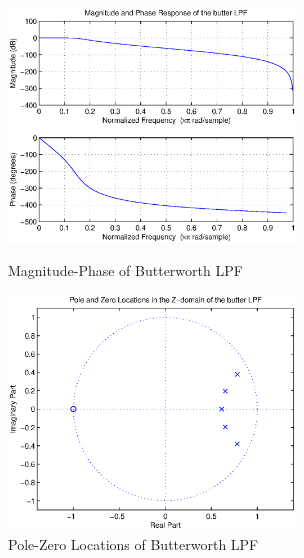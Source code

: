 \documentclass{article}
\begin{document}
\begin{figure}[htb]
\begin{minipage}[b]{0.5\linewidth}
\centering
\includegraphics[width=3in]{project6_01.eps}
\caption{Magnitude-Phase of  Butterworth LPF}
\label{fig:figure1}
\end{minipage}
\hspace{0.5cm}
\begin{minipage}[b]{0.5\linewidth}
\centering
\includegraphics[width=3in]{project6_02.eps}
\caption{Pole-Zero Locations of  Butterworth LPF}
\label{fig:figure2}
\end{minipage}
\end{figure}
\end{document}

